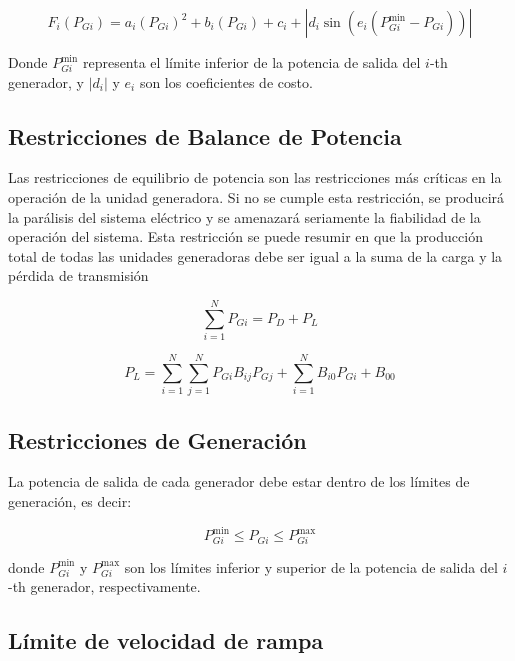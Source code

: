 \documentclass[11pt]{article}
\begin{document}
\begin{equation}
    F_i(P_{Gi}) = a_i(P_{Gi})^2 + b_i(P_{Gi}) + c_i + |d_i \sin(e_i (P_{Gi}^{\min} - P_{Gi}))|
\end{equation}

Donde \( P_{Gi}^{\min} \) representa el límite inferior de la potencia de salida del \( i \)-th generador, 
y \( |d_i| \) y \( e_i \) son los coeficientes de costo. 

\subsection{Restricciones de Balance de Potencia}
Las restricciones de equilibrio de potencia son las restricciones más críticas en la operación de la unidad generadora. 
Si no se cumple esta restricción, se producirá la parálisis del sistema eléctrico y se amenazará seriamente la fiabilidad
 de la operación del sistema. Esta restricción se puede resumir en que la producción total de todas las unidades generadoras 
 debe ser igual a la suma de la carga y la pérdida de transmisión

\begin{equation}
    \sum_{i=1}^{N} P_{Gi} = P_{D} + P_{L}
\end{equation}

\begin{equation}
    P_{L} = \sum_{i=1}^{N}\sum_{j=1}^{N} P_{Gi}B_{ij}P_{Gj} + \sum_{i=1}^{N}B_{i0}P_{Gi} + B_{00}
\end{equation}

\subsection{Restricciones de Generación}

La potencia de salida de cada generador debe estar dentro de los límites de generación, es decir:

\begin{equation}
    P_{Gi}^{\min} \leq P_{Gi} \leq P_{Gi}^{\max}
\end{equation}

donde \( P_{Gi}^{\min} \) y \( P_{Gi}^{\max} \) son los límites inferior y superior de la potencia de salida del 
\( i \)-th generador, respectivamente.

\subsection{Límite de velocidad de rampa}
\end{document}
